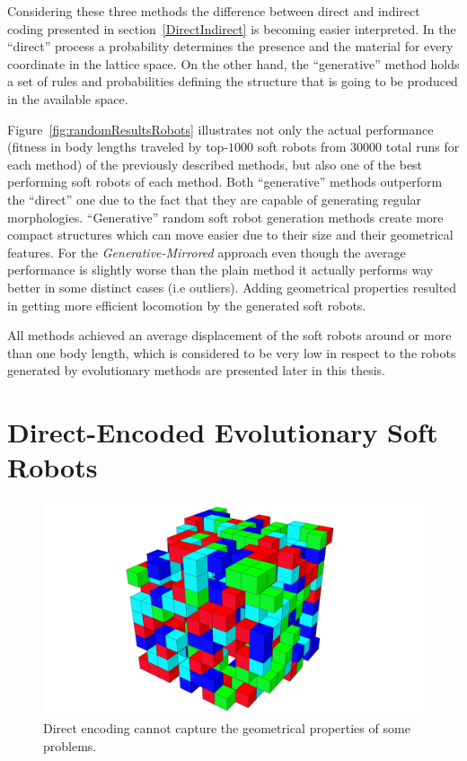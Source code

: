 Considering these three methods the difference between direct and indirect coding presented in section~\ref{DirectIndirect} is becoming easier interpreted. In the ``direct'' process a probability determines the presence and the material for every coordinate in the lattice space. On the other hand, the ``generative'' method holds a set of rules and probabilities defining the structure that is going to be produced in the available space.

Figure~\ref{fig:randomResultsRobots} illustrates not only the actual performance (fitness in body lengths traveled by top-$1000$ soft robots from $30000$ total runs for each method) of the previously described methods, but also one of the best performing soft robots of each method. Both ``generative'' methods outperform the ``direct'' one due to the fact that they are capable of generating regular morphologies. ``Generative'' random soft robot generation methods create more compact structures which can move easier due to their size and their geometrical features. For the \textit{Generative-Mirrored} approach even though the average performance is slightly worse than the plain method it actually performs way better in some distinct cases (i.e outliers). Adding geometrical properties resulted in getting more efficient locomotion by the generated soft robots.

All methods achieved an average displacement of the soft robots around or more than one body length, which is considered to be very low in respect to the robots generated by evolutionary methods are presented later in this thesis.

\section{Direct-Encoded Evolutionary Soft Robots}
\label{DirectEncodingEvolution}

\begin{figure}
\centering
\includegraphics[height=0.2\textheight]{../Figures/Robots/direct.jpg}
\caption{Direct encoding cannot capture the geometrical properties of some problems.}
\label{fig:directRobot}
\end{figure}

